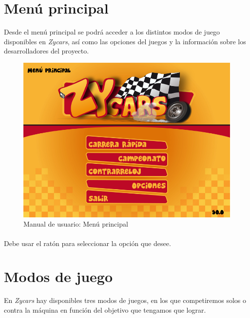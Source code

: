 \section{Menú principal}

\paragraph{}
Desde el menú principal se podrá acceder a los distintos modos de juego disponibles en \emph{Zycars}, así
como las opciones del juegos y la información sobre los desarrolladores del proyecto.

\begin{figure}[H]
  \label{menu_princiapl}
  \begin{center}
    \includegraphics[scale=0.4]{imagenes/capturas/menuprincipal.png}
  \end{center}
  \caption{Manual de usuario: Menú principal}
\end{figure}

\paragraph{}
Debe usar el ratón para seleccionar la opción que desee.

\section{Modos de juego}

\paragraph{}
En \emph{Zycars} hay disponibles tres modos de juegos, en los que competiremos solos o contra la máquina en función
del objetivo que tengamos que lograr.

